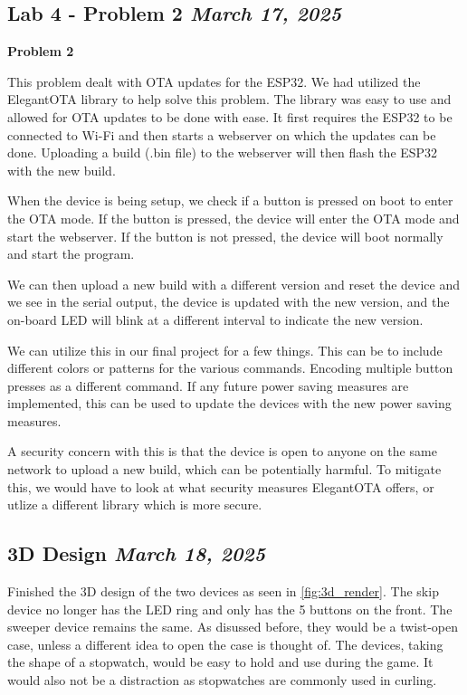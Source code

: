 \documentclass{article}
\newcommand{\logbookentry}[2]{
    \subsection*{#1 \hfill \textit{#2}} 
}
\begin{document}
\logbookentry{Lab 4 - Problem 2}{March 17, 2025}
\textbf{Problem 2}

This problem dealt with OTA updates for the ESP32. We had utilized the ElegantOTA library to help solve this problem. The library was easy to use and allowed for OTA updates to be done with ease. It first requires the ESP32 to be connected to Wi-Fi and then starts a webserver on which the updates can be done. Uploading a build (.bin file) to the webserver will then flash the ESP32 with the new build.

When the device is being setup, we check if a button is pressed on boot to enter the OTA mode. If the button is pressed, the device will enter the OTA mode and start the webserver. If the button is not pressed, the device will boot normally and start the program. 

We can then upload a new build with a different version and reset the device and we see in the serial output, the device is updated with the new version, and the on-board LED will blink at a different interval to indicate the new version.

We can utilize this in our final project for a few things. This can be to include different colors or patterns for the various commands. Encoding multiple button presses as a different command. If any future power saving measures are implemented, this can be used to update the devices with the new power saving measures.

A security concern with this is that the device is open to anyone on the same network to upload a new build, which can be potentially harmful. To mitigate this, we would have to look at what security measures ElegantOTA offers, or utlize a different library which is more secure.

\logbookentry{3D Design}{March 18, 2025}

Finished the 3D design of the two devices as seen in \autoref{fig:3d_render}. The skip device no longer has the LED ring and only has the 5 buttons on the front. The sweeper device remains the same. As disussed before, they would be a twist-open case, unless a different idea to open the case is thought of. The devices, taking the shape of a stopwatch, would be easy to hold and use during the game. It would also not be a distraction as stopwatches are commonly used in curling.
\end{document}
